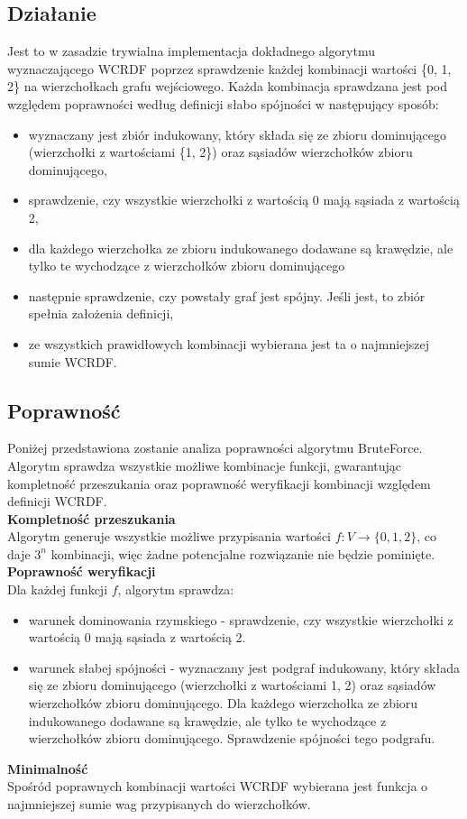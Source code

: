 \subsection{Działanie}
Jest to w zasadzie trywialna implementacja dokładnego algorytmu wyznaczającego WCRDF poprzez sprawdzenie każdej kombinacji wartości \{0, 1, 2\} na wierzchołkach grafu wejściowego. Każda kombinacja sprawdzana jest pod względem poprawności według definicji słabo spójności w następujący sposób:
\begin{itemize}
    \item wyznaczany jest zbiór indukowany, który składa się ze zbioru dominującego (wierzchołki z wartościami \{1, 2\}) oraz sąsiadów wierzchołków zbioru dominującego,
    \item sprawdzenie, czy wszystkie wierzchołki z wartością 0 mają sąsiada z wartością 2,
    \item dla każdego wierzchołka ze zbioru indukowanego dodawane są krawędzie, ale tylko te wychodzące z wierzchołków zbioru dominującego
    \item następnie sprawdzenie, czy powstały graf jest spójny. Jeśli jest, to zbiór spełnia założenia definicji,
    \item ze wszystkich prawidłowych kombinacji wybierana jest ta o najmniejszej sumie WCRDF.
\end{itemize}

\subsection{Poprawność}
\label{subsec:bf_poprawnosc}

Poniżej przedstawiona zostanie analiza poprawności algorytmu BruteForce.  Algorytm sprawdza wszystkie możliwe kombinacje funkcji, gwarantując kompletność przeszukania oraz poprawność weryfikacji kombinacji względem definicji WCRDF.\\
\textbf{Kompletność przeszukania}\\
Algorytm generuje wszystkie możliwe przypisania wartości $f: V \to \{0,1,2\}$, co daje $3^n$ kombinacji, więc żadne potencjalne rozwiązanie nie będzie pominięte.\\
\textbf{Poprawność weryfikacji}\\
Dla każdej funkcji $f$, algorytm sprawdza:

\begin{itemize}
    \item warunek dominowania rzymskiego - sprawdzenie, czy wszystkie wierzchołki z wartością 0 mają sąsiada z wartością 2.
    
    \item warunek słabej spójności - wyznaczany jest podgraf indukowany, który składa się ze zbioru dominującego (wierzchołki z wartościami {1, 2}) oraz sąsiadów wierzchołków zbioru dominującego. Dla każdego wierzchołka ze zbioru indukowanego dodawane są krawędzie, ale tylko te wychodzące z wierzchołków zbioru dominującego. Sprawdzenie spójności tego podgrafu.
\end{itemize}
\textbf{Minimalność}\\
Spośród poprawnych kombinacji wartości WCRDF wybierana jest funkcja o najmniejszej sumie wag przypisanych do wierzchołków.\\

